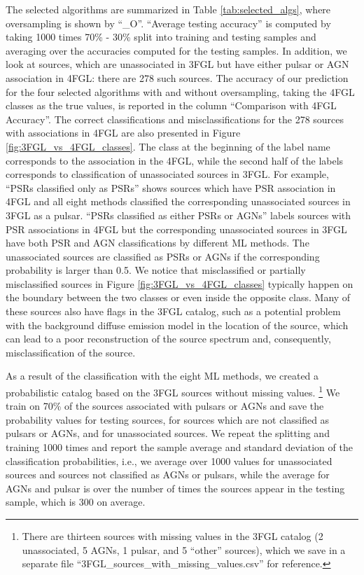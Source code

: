 The selected algorithms are summarized in Table \ref{tab:selected_algs}, where oversampling is shown by ``\_O''.
``Average testing accuracy'' is computed by taking 1000 times 70\% - 30\% split into training and testing samples and averaging over the 
accuracies computed for the testing samples.
In addition, we look at sources, which are unassociated in 3FGL but have either pulsar or AGN association in 4FGL: there are 278 such sources.
The accuracy of our prediction for the four selected algorithms with and without oversampling, taking the 4FGL classes as the true values, is reported in the column ``Comparison with 4FGL Accuracy''.
The correct classifications and misclassifications for the 278 sources with associations in 4FGL are also presented in Figure \ref{fig:3FGL_vs_4FGL_classes}.
The class at the beginning of the label name corresponds to the association in the 4FGL, while the second half of the labels corresponds to classification of unassociated sources in 3FGL. For example, ``PSRs classified only as PSRs'' shows sources which have PSR association in 4FGL and all eight methods classified the corresponding unassociated sources in 3FGL as a pulsar. ``PSRs classified as either PSRs or AGNs'' labels sources with PSR associations in 4FGL but the corresponding unassociated sources in 3FGL have both PSR and AGN classifications by different ML methods.
The unassociated sources are classified as PSRs or AGNs if the corresponding probability is larger than 0.5.
We notice that misclassified or partially misclassified sources in Figure \ref{fig:3FGL_vs_4FGL_classes} typically happen on the boundary between the two classes or even inside the opposite class.
Many of these sources also have flags in the 3FGL catalog, such as a potential problem with the background diffuse emission model in the location of the source, which can lead to a poor reconstruction of the source spectrum and, consequently, misclassification of the source.


As a result of the classification with the eight ML methods,
we created a probabilistic catalog based on the 3FGL sources without missing values.%
\footnote{There are thirteen sources with missing values in the 3FGL catalog (2 unassociated, 5 AGNs, 1 pulsar, and 5 ``other'' sources), 
which we save in a separate file ``3FGL\_sources\_with\_missing\_values.csv'' for reference.}
We train on 70\% of the sources associated with pulsars or AGNs and save the probability values for testing sources, for sources which are not classified as pulsars or AGNs, and for unassociated sources.
We repeat the splitting and training 1000 times and report the sample average and standard deviation of the classification probabilities,
i.e., we average over 1000 values for unassociated sources and sources not classified as AGNs or pulsars, 
while the average for AGNs and pulsar is over the number of times the sources appear in the testing sample, which is 300 on average.

